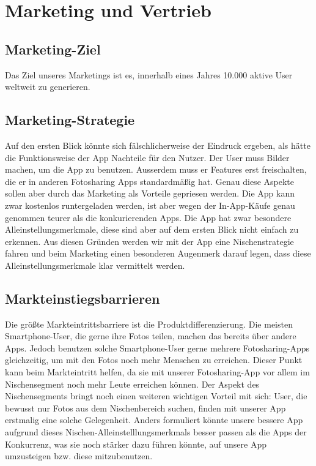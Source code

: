 \chapter{Marketing und Vertrieb}


\section{Marketing-Ziel}

Das Ziel unseres Marketings ist es, innerhalb eines Jahres 10.000 aktive User weltweit zu generieren.

\section{Marketing-Strategie}

Auf den ersten Blick könnte sich fälschlicherweise der Eindruck ergeben, als hätte die Funktionsweise der App Nachteile für den Nutzer. Der User muss Bilder machen, um die App zu benutzen. Ausserdem muss er Features erst freischalten, die er in anderen Fotosharing Apps standardmäßig hat. Genau diese Aspekte sollen aber durch das Marketing als Vorteile gepriesen werden.
Die App kann zwar kostenlos runtergeladen werden, ist aber wegen der In-App-Käufe genau genommen teurer als die konkurierenden Apps. Die App hat zwar besondere Alleinstellungsmerkmale, diese sind aber auf dem ersten Blick nicht einfach zu erkennen. Aus diesen Gründen werden wir mit der App eine Nischenstrategie fahren und beim Marketing einen besonderen Augenmerk darauf legen, dass diese Alleinstellungsmerkmale klar vermittelt werden.

\section{Markteinstiegsbarrieren}

Die größte Markteintrittsbarriere ist die Produktdifferenzierung. Die meisten Smartphone-User, die gerne ihre Fotos teilen, machen das bereits über andere Apps. Jedoch benutzen solche Smartphone-User gerne mehrere Fotosharing-Apps gleichzeitig, um mit den Fotos noch mehr Menschen zu erreichen. Dieser Punkt kann beim Markteintritt helfen, da sie mit unserer Fotosharing-App vor allem im Nischensegment noch mehr Leute erreichen können. Der Aspekt des Nischensegments bringt noch einen weiteren wichtigen Vorteil mit sich: User, die bewusst nur Fotos aus dem Nischenbereich suchen, finden mit unserer App erstmalig eine solche Gelegenheit. Anders formuliert könnte unsere bessere App aufgrund dieses Nischen-Alleinstelllungsmerkmals besser passen als die Apps der Konkurrenz, was sie noch stärker dazu führen könnte, auf unsere App umzusteigen bzw. diese mitzubenutzen.


